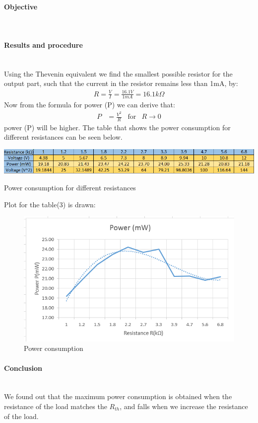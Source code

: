 \paragraph*{Objective} \hfill \\

\paragraph*{Results and procedure} \hfill\\
Using the Thevenin equivalent we find the smallest possible resistor for the output part, such that the current in the resistor remains less than 1mA, by:
\begin{align*}
R= \frac{V}{I} =\frac{16.1 V}{1mA} = 16.1k\Omega
\end{align*}
Now from the formula for power (P) we can derive that:
\begin{align*}
P&=\frac{V^2}{R} \,\,\,\,\, \text{for}&	R\rightarrow 0
\end{align*}
power (P) will be higher. 
The table that shows the power consumption for different resistances can be seen below.
\begin{table}[H]
	\centering
	\includegraphics[width=1\textwidth]{./images/Kacper/23.png}
	\caption{Power consumption for different resistances}
	\label{Power consumption for different resistances}
\end{table}
\begin{flushleft}
Plot for the table(3) is drawn:
\end{flushleft}
\begin{figure}[H]
	\centering
\includegraphics[width=1\textwidth]{./images/Kacper/23a.png}
	\caption{Power consumption}
	\label{Power consumption}
\end{figure}

\paragraph*{Conclusion} \hfill \\
We found out that the maximum power consumption is obtained when the resistance of the load matches the $R_{th}$, and falls when we increase the resistance of the load. 